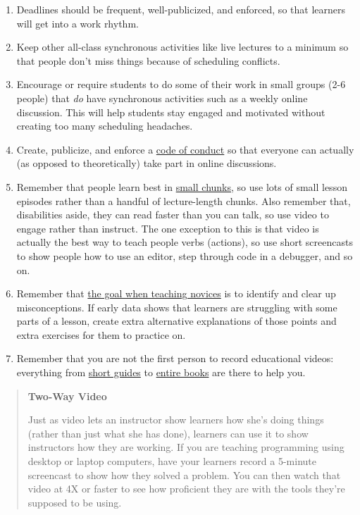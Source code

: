 \documentclass[10pt,statementpaper]{memoir}
\begin{document}
\begin{enumerate}
\def\labelenumi{\arabic{enumi}.}
\item
  Deadlines should be frequent, well-publicized, and enforced, so that
  learners will get into a work rhythm.
\item
  Keep other all-class synchronous activities like live lectures to a
  minimum so that people don't miss things because of scheduling
  conflicts.
\item
  Encourage or require students to do some of their work in small groups
  (2-6 people) that \emph{do} have synchronous activities such as a
  weekly online discussion. This will help students stay engaged and
  motivated without creating too many scheduling headaches.
\item
  Create, publicize, and enforce a
  \href{practices.html\#have-a-code-of-conduct}{code of conduct} so that
  everyone can actually (as opposed to theoretically) take part in
  online discussions.
\item
  Remember that people learn best in \href{memory.html}{small chunks},
  so use lots of small lesson episodes rather than a handful of
  lecture-length chunks. Also remember that, disabilities aside, they
  can read faster than you can talk, so use video to engage rather than
  instruct. The one exception to this is that video is actually the best
  way to teach people verbs (actions), so use short screencasts to show
  people how to use an editor, step through code in a debugger, and so
  on.
\item
  Remember that \href{novice.html}{the goal when teaching novices} is to
  identify and clear up misconceptions. If early data shows that
  learners are struggling with some parts of a lesson, create extra
  alternative explanations of those points and extra exercises for them
  to practice on.
\item
  Remember that you are not the first person to record educational
  videos: everything from
  \href{https://www.adelaide.edu.au/learning/teaching/communities-of-practice/elearning/Guide_to_Creating_Educational_Videos.pdf}{short
  guides} to \href{biblio.html\#spannaus-video}{entire books} are there
  to help you.
\end{enumerate}

\begin{quote}
\textbf{Two-Way Video}

Just as video lets an instructor show learners how she's doing things
(rather than just what she has done), learners can use it to show
instructors how they are working. If you are teaching programming using
desktop or laptop computers, have your learners record a 5-minute
screencast to show how they solved a problem. You can then watch that
video at 4X or faster to see how proficient they are with the tools
they're supposed to be using.
\end{quote}
\end{document}
